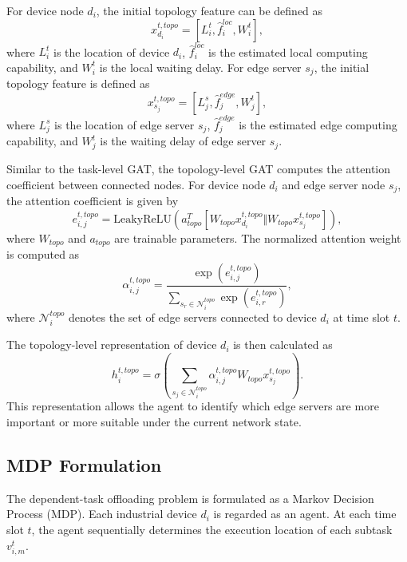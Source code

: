 \documentclass[conference]{IEEEtran}
\begin{document}
For device node $d_i$, the initial topology feature can be defined as
\begin{equation}
x_{d_i}^{t,topo}
=
[L_i^t,\hat{f}_i^{loc},W_i^t],
\end{equation}
where $L_i^t$ is the location of device $d_i$, $\hat{f}_i^{loc}$ is the estimated local computing capability, and $W_i^t$ is the local waiting delay. For edge server $s_j$, the initial topology feature is defined as
\begin{equation}
x_{s_j}^{t,topo}
=
[L_j^s,\hat{f}_j^{edge},W_j^t],
\end{equation}
where $L_j^s$ is the location of edge server $s_j$, $\hat{f}_j^{edge}$ is the estimated edge computing capability, and $W_j^t$ is the waiting delay of edge server $s_j$.

Similar to the task-level GAT, the topology-level GAT computes the attention coefficient between connected nodes. For device node $d_i$ and edge server node $s_j$, the attention coefficient is given by
\begin{equation}
e_{i,j}^{t,topo}
=
\mathrm{LeakyReLU}
\left(
a_{topo}^{T}
[W_{topo}x_{d_i}^{t,topo}
\Vert
W_{topo}x_{s_j}^{t,topo}]
\right),
\end{equation}
where $W_{topo}$ and $a_{topo}$ are trainable parameters. The normalized attention weight is computed as
\begin{equation}
\alpha_{i,j}^{t,topo}
=
\frac{
\exp(e_{i,j}^{t,topo})
}{
\sum_{s_r\in\mathcal{N}_{i}^{topo}}
\exp(e_{i,r}^{t,topo})
},
\end{equation}
where $\mathcal{N}_{i}^{topo}$ denotes the set of edge servers connected to device $d_i$ at time slot $t$.

The topology-level representation of device $d_i$ is then calculated as
\begin{equation}
h_i^{t,topo}
=
\sigma
\left(
\sum_{s_j\in\mathcal{N}_{i}^{topo}}
\alpha_{i,j}^{t,topo}
W_{topo}x_{s_j}^{t,topo}
\right).
\end{equation}
This representation allows the agent to identify which edge servers are more important or more suitable under the current network state.

\subsection{MDP Formulation}

The dependent-task offloading problem is formulated as a Markov Decision Process (MDP). Each industrial device $d_i$ is regarded as an agent. At each time slot $t$, the agent sequentially determines the execution location of each subtask $v_{i,m}^t$.
\end{document}
